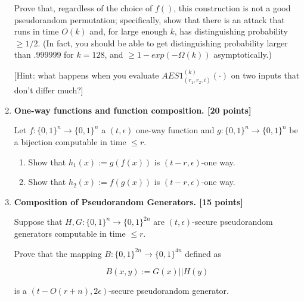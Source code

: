 \documentclass[12pt]{article}
\def\B{\{0,1\}}
\begin{document}
\begin{enumerate}
\begin{itemize}
\end{itemize}

Prove that, regardless of the choice of $f()$, this construction
is not a good pseudorandom permutation; specifically, show that
there is an attack that runs in time $O(k)$ and, for large enough $k$,
has distinguishing probability $\geq 1/2$. (In fact, you should be
able to get distinguishing probability larger than $.999999$
for $k=128$, and $\geq 1-exp(-\Omega(k))$ asymptotically.)

[Hint: what happens when you evaluate $AES1^{(k)}_{(r_1,r_2,i)}(\cdot)$
on two inputs that don't differ much?]
\fi

\item {\bf One-way functions and function composition. [20 points]} 

Let $f: \B^n \to \B^n$ a $(t,\epsilon)$ one-way function
and $g:\B^n \to \B^n$ be a bijection computable in time $\leq r$.

\begin{enumerate}

\item
Show that $h_1 (x) := g(f(x))$ is $(t-r,\epsilon)$-one way.

\item Show that $h_2 (x) := f(g(x))$ is $(t-r,\epsilon)$-one way.


\end{enumerate}


\item {\bf Composition of Pseudorandom Generators. [15 points]}

Suppose that $H,G : \B^n \to \B^{2n}$ are $(t,\epsilon)$-secure
pseudorandom generators computable in time $\leq r$.

Prove that the mapping $B: \B^{2n} \to \B^{4n}$ defined as

\[ B(x,y) := G(x) || H(y) \]

is a $(t- O(r+n), 2\epsilon)$-secure pseudorandom generator.



\end{enumerate}
\end{document}
